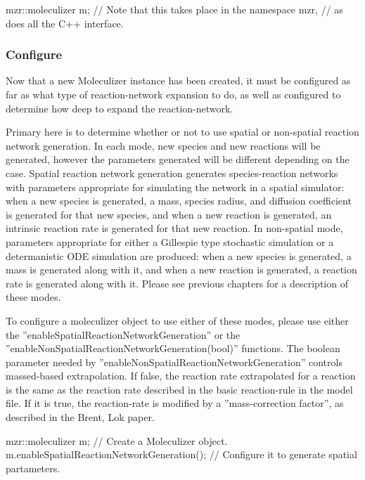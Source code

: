 \begin{1stlisting}
mzr::moleculizer m; // Note that this takes place in the namespace mzr,
                    // as does all the C++ interface.
\end{1stlisting}


\subsubsection{Configure}
Now that a new Moleculizer instance has been created, it must be
configured as far as what type of reaction-network expansion to do, as
well as configured to determine how deep to expand the
reaction-network.  

Primary here is to determine whether or not to use spatial or
non-spatial reaction network generation.  In each mode, new species
and new reactions will be generated, however the parameters generated
will be different depending on the case.  Spatial reaction network
generation generates species-reaction networks with parameters
appropriate for simulating the network in a spatial simulator: when a
new species is generated, a mass, species radius, and diffusion
coefficient is generated for that new species, and when a new reaction
is generated, an intrinsic reaction rate is generated for that new
reaction.  In non-spatial mode, parameters appropriate for either a
Gillespie type stochastic simulation or a determanistic ODE simulation
are produced: when a new species is generated, a mass is generated
along with it, and when a new reaction is generated, a reaction rate
is generated along with it.  Please see previous chapters for a
description of these modes.

To configure a moleculizer object to use either of these modes, please
use either the ''enableSpatialReactionNetworkGeneration'' or the
''enableNonSpatialReactionNetworkGeneration(bool)'' functions.  The
boolean parameter needed by
''enableNonSpatialReactionNetworkGeneration'' controls massed-based
extrapolation.  If false, the reaction rate extrapolated for a
reaction is the same as the reaction rate described in the basic
reaction-rule in the model file.  If it is true, the reaction-rate is
modified by a ''mass-correction factor'', as described in the Brent,
Lok paper.  

\begin{1stlisting}
  mzr::moleculizer m;                          // Create a Moleculizer object.
  m.enableSpatialReactionNetworkGeneration();  // Configure it to generate spatial partameters.
\end{1stlisting}

